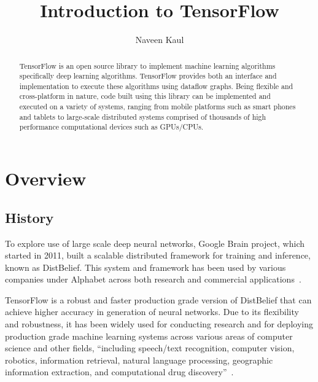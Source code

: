 
\title{Introduction to TensorFlow}


\author{Naveen Kaul}


\renewcommand{\shortauthors}{N. Kaul}


\begin{abstract}
TensorFlow is an open source library to implement machine
learning algorithms specifically deep learning algorithms. TensorFlow
provides both an interface and implementation to execute these
algorithms using dataflow graphs. Being flexible and cross-platform in
nature, code built using this library can be implemented and executed
on a variety of systems, ranging from mobile platforms such as smart
phones and tablets to large-scale distributed systems comprised of
thousands of high performance computational devices such as
GPUs/CPUs. 

\end{abstract}


\maketitle

\section{Overview}

\subsection*{History}
To explore use of large scale deep neural networks, Google Brain
project, which started in 2011, built a scalable distributed framework
for training and inference, known as DistBelief. This system and
framework has been used by various companies under Alphabet across
both research and commercial
applications~\cite{hid-sp18-510-tensorflow2015-whitepaper}. 

TensorFlow is a robust and faster production grade version of
DistBelief that can achieve higher accuracy in generation of neural
networks. Due to its flexibility and robustness, it has been widely
used for conducting research and for deploying production grade
machine learning systems across various areas of computer science and
other fields, ``including speech/text recognition, computer vision,
robotics, information retrieval, natural language processing,
geographic information extraction, and computational drug
discovery''~\cite{hid-sp18-510-tensorflow2015-whitepaper}. 


